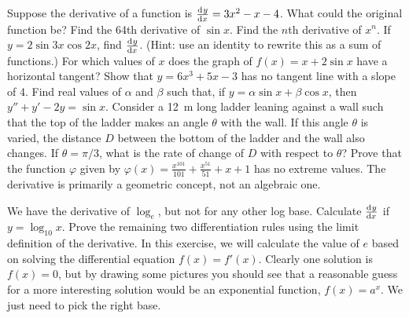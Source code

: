 \begin{questions}
  \questioA Suppose the derivative of a function is $ \od{y}{x} = 3x^2 - x - 4 $. What could the original function be?
  \questioM Find the 64th derivative of $ \sin x $.
  \questioM Find the $ n$th derivative of $ x^n $.
  \questioM If $ y = 2\sin 3x \cos 2x $, find $ \od{y}{x} $. (Hint: use an identity to rewrite this as a sum of functions.)
  \questioM For which values of $ x $ does the graph of $ f(x) = x + 2\sin x $ have a horizontal tangent?
  \questioE Show that $ y = 6x^3 + 5x - 3 $ has no tangent line with a slope of 4.
  \questioE Find real values of $ \alpha $ and $ \beta $ such that, if $ y = \alpha \sin x + \beta \cos x $,
            then $ y'' + y' -2y = \sin x $.
  \questioE Consider a \SI{12}{\metre} long ladder leaning against a wall such that the top of the ladder makes an
            angle $ \theta $ with the wall. If this angle $ \theta $ is varied, the distance $ D $ between the bottom
            of the ladder and the wall also changes. If $ \theta = \pi/3 $, what is the rate of change of $ D $ with
            respect to $ \theta $?
  \questioE Prove that the function $ \varphi $ given by $ \varphi(x) = \frac{x^{101}}{101} + \frac{x^{51}}{51} + x + 1 $
            has no extreme values.
  \questioM The derivative is primarily a geometric concept, not an algebraic one.
  \questioE We have the derivative of $ \log_e $, but not for any other log base. Calculate $ \od{y}{x} $ if $ y = \log_{10} x $.
  \questioE Prove the remaining two differentiation rules using the limit definition of the derivative.
  \questioS In this exercise, we will calculate the value of $ e $ based on solving the differential
            equation $ f(x) = f'(x) $. Clearly one solution is $ f(x) = 0 $, but by drawing some pictures
            you should see that a reasonable guess for a more interesting solution would be an exponential function, $ f(x) = a^x $.
            We just need to pick the right base.
    \begin{parts}

\end{parts}
\end{questions}
